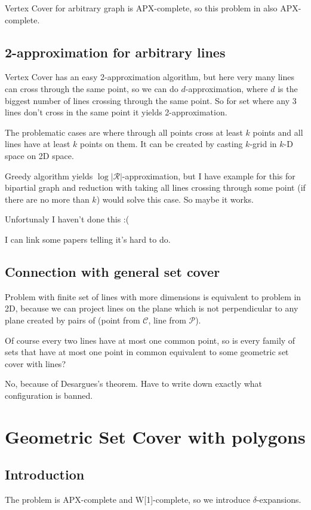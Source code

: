 \documentclass[en]{pracamgr}
\begin{document}
Vertex Cover for arbitrary graph is APX-complete,
so this problem in also APX-complete.

\section{2-approximation for arbitrary lines}
Vertex Cover has an easy 2-approximation algorithm,
but here very many lines can cross through
the same point, so we can do $d$-approximation,
where $d$ is the biggest number of lines crossing through the same point.
So for set where any 3 lines don't cross in the same point
it yields 2-approximation.

The problematic cases are where through all points
cross at least $k$ points and all lines have at least $k$ points on them.
It can be created by casting $k$-grid in $k$-D space on 2D space.

Greedy algorithm yields $\log |\mathcal{R}|$-approximation,
but I have example for this for bipartial graph and
reduction with taking all lines crossing through some point
(if there are no more than $k$) would solve this case.
So maybe it works.

Unfortunaly I haven't done this :(

I can link some papers telling it's hard to do.

\section{Connection with general set cover}
Problem with finite set of lines with more dimensions
is equivalent
to problem in 2D, because we can project
lines on the plane which is not perpendicular
to any plane created by pairs of
(point from $\mathcal{C}$, line from $\mathcal{P}$).

Of course every two lines have at most one common point,
so is every family of sets that have at most one point
in common equivalent to some geometric set cover with lines?

No, because of Desargues's theorem.
Have to write down exactly what configuration is banned.


\chapter{Geometric Set Cover with polygons}
\section{Introduction}
The problem is APX-complete and W[1]-complete,
so we introduce $\delta$-expansions.
\end{document}

